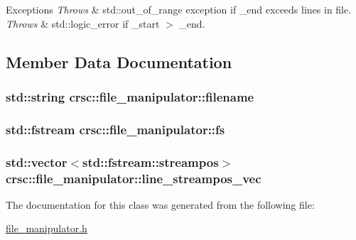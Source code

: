 \begin{DoxyExceptions}{Exceptions}
{\em Throws} & std\+::out\+\_\+of\+\_\+range exception if \+\_\+end exceeds lines in file. \\
\hline
{\em Throws} & std\+::logic\+\_\+error if \+\_\+start $>$ \+\_\+end. \\
\hline
\end{DoxyExceptions}


\subsection{Member Data Documentation}
\subsubsection[{\texorpdfstring{filename}{filename}}]{\setlength{\rightskip}{0pt plus 5cm}std\+::string crsc\+::file\+\_\+manipulator\+::filename\hspace{0.3cm}{\ttfamily [private]}}\hypertarget{classcrsc_1_1file__manipulator_a3b8ec12bff89aa76b3908c0081056076}{}\label{classcrsc_1_1file__manipulator_a3b8ec12bff89aa76b3908c0081056076}
\subsubsection[{\texorpdfstring{fs}{fs}}]{\setlength{\rightskip}{0pt plus 5cm}std\+::fstream crsc\+::file\+\_\+manipulator\+::fs\hspace{0.3cm}{\ttfamily [private]}}\hypertarget{classcrsc_1_1file__manipulator_a167ab2d18c75238450ab7496a38bbfe0}{}\label{classcrsc_1_1file__manipulator_a167ab2d18c75238450ab7496a38bbfe0}
\subsubsection[{\texorpdfstring{line\+\_\+streampos\+\_\+vec}{line_streampos_vec}}]{\setlength{\rightskip}{0pt plus 5cm}std\+::vector$<$std\+::fstream\+::streampos$>$ crsc\+::file\+\_\+manipulator\+::line\+\_\+streampos\+\_\+vec\hspace{0.3cm}{\ttfamily [private]}}\hypertarget{classcrsc_1_1file__manipulator_ad856f2baab967b657f9a10003179e8c5}{}\label{classcrsc_1_1file__manipulator_ad856f2baab967b657f9a10003179e8c5}


The documentation for this class was generated from the following file\+:\begin{DoxyCompactItemize}
\item 
\hyperlink{file__manipulator_8h}{file\+\_\+manipulator.\+h}\end{DoxyCompactItemize}
